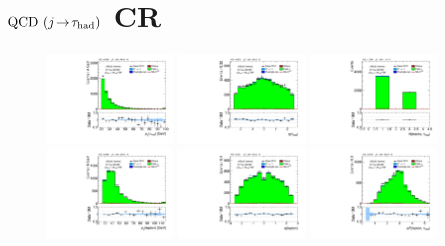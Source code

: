 \clearpage

\section{$\text{QCD} \ (j\!\rightarrow\!\tau_\text{had})$ CR}

\begin{figure}[!htpb]
  \centering
  \includegraphics[width=0.30\textwidth]{figures/analysis/vbf-QCDCR/tau-pt}
  \includegraphics[width=0.30\textwidth]{figures/analysis/vbf-QCDCR/tau-eta}
  \includegraphics[width=0.30\textwidth]{figures/analysis/vbf-QCDCR/tau-numTrack} \\
  \includegraphics[width=0.30\textwidth]{figures/analysis/vbf-QCDCR/lep-pt-hi}
  \includegraphics[width=0.30\textwidth]{figures/analysis/vbf-QCDCR/lep-eta}
  \includegraphics[width=0.30\textwidth]{figures/analysis/vbf-QCDCR/taulep-dR} \\

\end{figure}
